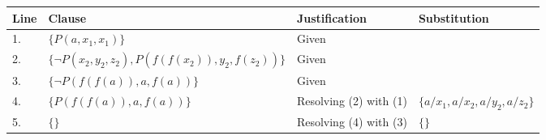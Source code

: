 \documentclass{article}
\begin{document}
\begin{enumerate}
  \begin{answer}
    \begin{center}
    \begin{tabular}{llll}
      Line & Clause & Justification & Substitution \\ \hline
      1. & $\{ P(a,x_1,x_1) \}$ & Given & \\
      2. & $\{ \neg P(x_2,y_2,z_2), P(f(f(x_2)),y_2,f(z_2)) \}$ & Given & \\
      3. & $\{ \neg P(f(f(a)),a,f(a)) \}$ & Given & \\ \hline
      4. & $\{P(f(f(a)),a,f(a))\}$ & Resolving (2) with (1)  & $\{a/x_1,a/x_2,a/y_2,a/z_2\}$\\
      5. & $\{\}$ & Resolving (4) with (3) & $\{\}$
    \end{tabular}
  \end{center}
  \end{answer}

\end{enumerate}
\end{document}
